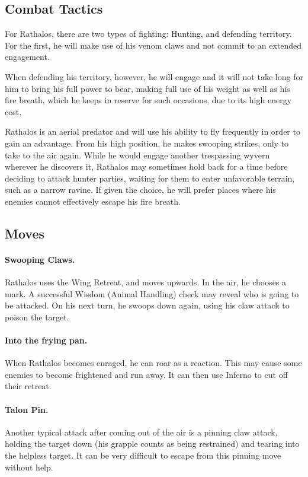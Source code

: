 \pagebreak[3]

\subsection{Combat Tactics}
For Rathalos, there are two types of fighting: Hunting, and defending territory. For the first, he will make use of his venom claws and not commit to an extended engagement.

When defending his territory, however, he will engage and it will not take long for him to bring his full power to bear, making full use of his weight as well as his fire breath, which he keeps in reserve for such occasions, due to its high energy cost.

Rathalos is an aerial predator and will use his ability to fly frequently in order to gain an advantage. From his high position, he makes swooping strikes, only to take to the air again. While he would engage another trespassing wyvern wherever he discovers it, Rathalos may sometimes hold back for a time before deciding to attack hunter parties, waiting for them to enter unfavorable terrain, such as a narrow ravine. If given the choice, he will prefer places where his enemies cannot effectively escape his fire breath.

\subsection*{Moves}

\paragraph*{Swooping Claws.} Rathalos uses the Wing Retreat, and moves upwards. In the air, he chooses a mark. A successful Wisdom (Animal Handling) check may reveal who is going to be attacked. On his next turn, he swoops down again, using his claw attack to poison the target.

\paragraph*{Into the frying pan.} When Rathalos becomes enraged, he can roar as a reaction. This may cause some enemies to become frightened and run away. It can then use Inferno to cut off their retreat.

\paragraph*{Talon Pin.} Another typical attack after coming out of the air is a pinning claw attack, holding the target down (his grapple counts as being restrained) and tearing into the helpless target. It can be very difficult to escape from this pinning move without help.

